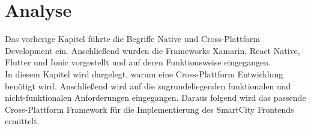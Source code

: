 \chapter{Analyse}
\label{ch:analyse}

Das vorherige Kapitel führte die Begriffe Native und Cross-Plattform Development ein. Anschließend wurden die Frameworks Xamarin, React Native, Flutter und Ionic vorgestellt und auf deren Funktionsweise eingegangen. \\
In diesem Kapitel wird dargelegt, warum eine Cross-Plattform Entwicklung benötigt wird. Anschließend wird auf die zugrundeliegenden funktionalen und nicht-funktionalen Anforderungen eingegangen. Daraus folgend wird das passende Cross-Plattform Framework für die Implementierung des SmartCity Frontends ermittelt. 